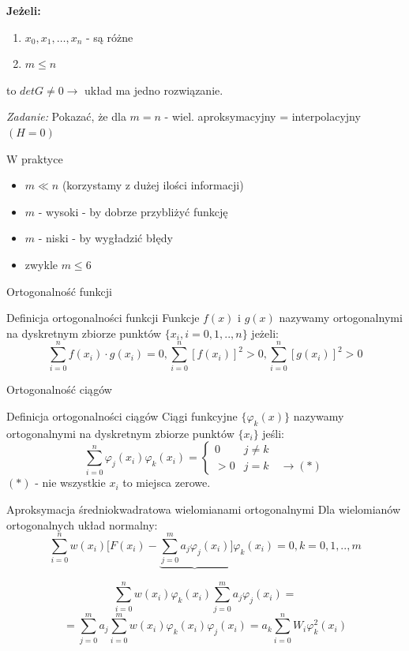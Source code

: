 \begin{frame}
	\textbf{Jeżeli:}
    \begin{enumerate}
    \item $x_0,x_1,\ldots,x_n$ - są różne
    \item $m \leqslant n$
    \end{enumerate}
    to $det G \not= 0 \rightarrow$ układ ma jedno rozwiązanie. 
    \begin{flushright}
    	\textit{Zadanie: } \quad Pokazać, że dla $m = n$ - wiel. aproksymacyjny = interpolacyjny $(H=0)$
     \end{flushright}
\end{frame}
\begin{frame}{W praktyce}
	\begin{itemize}
	\item $m \ll n$ (korzystamy z dużej ilości informacji)
    \item $m$ - wysoki - by dobrze przybliżyć funkcję
    \item $m$ - niski - by wygładzić błędy
    \item zwykle $m \leqslant 6$
	\end{itemize}
\end{frame}
\begin{frame}{Ortogonalność funkcji}
	\begin{block}{Definicja ortogonalności funkcji}
	Funkcje $f(x)$ i $g(x)$ nazywamy ortogonalnymi na dyskretnym zbiorze punktów $\{x_i,i=0,1,..,n\}$ jeżeli:
    $$\sum_{i=0}^{n}f(x_i)\cdot g(x_i) = 0, \sum_{i=0}^{n}[f(x_i)]^2 > 0,\sum_{i=0}^{n}[g(x_i)]^2 > 0$$
	\end{block}
\end{frame}
\begin{frame}{Ortogonalność ciągów}
	\begin{block}{Definicja ortogonalności ciągów}
	Ciągi funkcyjne $\{\varphi_k(x)\}$ nazywamy ortogonalnymi na dyskretnym zbiorze punktów $\{x_i\}$ jeśli:
    $$\sum_{i=0}^{n}\varphi_j(x_i)\varphi_k(x_i) = \left\{\begin{array}{cl}
    	0 & j \not= k \\
        >0 & j = k \quad \rightarrow (*)
    \end{array}\right.$$
    $(*)$ - nie wszystkie $x_i$ to miejsca zerowe.
	\end{block}
\end{frame}
\begin{frame}{Aproksymacja średniokwadratowa wielomianami ortogonalnymi}
	Dla wielomianów ortogonalnych układ normalny:
    $$\sum_{i=0}^{n}w(x_i)\Bigg[F(x_i)-\underbrace{\sum_{j=0}^{m}a_j\varphi_j(x_i)}\Bigg]\varphi_k(x_i)=0,k=0,1,..,m$$
    \begin{center}
    	$$\sum_{i=0}^{n}w(x_i)\varphi_k(x_i)\sum_{j=0}^{m}a_j\varphi_j(x_i)=$$\newline$$=\sum_{j=0}^{m}a_j\sum_{i=0}^{m}w(x_i)\varphi_k(x_i)\varphi_j(x_i) = a_k\sum_{i=0}^{n}W_i\varphi_k^2(x_i)$$
    \end{center}
    
\end{frame}
